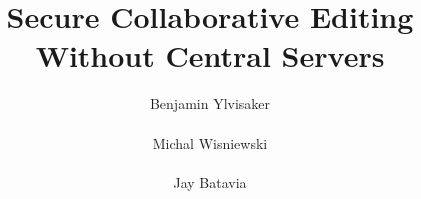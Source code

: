 \documentclass{sig-alternate-hotpets}
\begin{document}
\title{Secure Collaborative Editing Without Central Servers}
%
%
%
%
%

%
\author{
%
%
\alignauthor
Benjamin Ylvisaker\\
       \\
\alignauthor
Michal Wisniewski\\
       \\
\alignauthor
Jay Batavia\\
       \\
}
\end{document}

